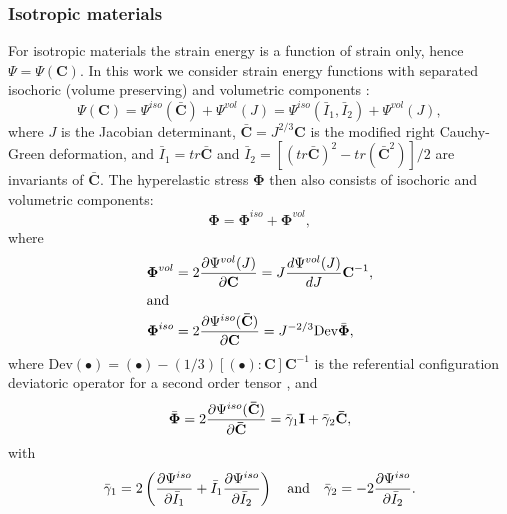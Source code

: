 	\subsubsection*{Isotropic materials}
For isotropic materials the strain energy is a function of strain only, hence $ \Psi = \Psi (\mathbf{C}) $. In this work we consider strain energy functions with separated isochoric (volume preserving) and volumetric components \citep{Holzapfel00}:
\begin{equation}
\label{chap5:IstrainEnergy}
\Psi (\mathbf{C}) = \Psi ^{iso} (\mathbf{\bar{C}}) + \Psi ^{vol} (J) = \Psi ^{iso} (\bar{I}_1, \bar{I}_2) + \Psi ^{vol} (J),
\end{equation}
where $ J $ is the Jacobian determinant, $ \mathbf{\bar{C}} = J^{2/3} \mathbf{C} $ is the modified right Cauchy-Green deformation, and $ \bar{I}_1 = tr \mathbf{\bar{C}} $ and $ \bar{I}_2 = \left[ (tr \mathbf{\bar{C}})^2 - tr (\mathbf{\bar{C}}^2) \right] / 2 $ are invariants of $ \mathbf{\bar{C}} $. The hyperelastic stress $ \boldsymbol \Phi $ then also consists of isochoric and volumetric components: 
\begin{equation}
\boldsymbol \Phi = \boldsymbol \Phi^{iso} +\boldsymbol \Phi^{vol} ,
\end{equation}
where
\begin{align}
\boldsymbol \Phi^{vol} &= 2 \dfrac{\partial \Psi^{vol}(J)}{\partial \mathbf{C}} = J \dfrac{d\Psi^{vol}(J)}{dJ} \mathbf{C}^{-1}, \label{chap5:Phi_vol} \\
\intertext{and}
\boldsymbol \Phi^{iso} &= 2 \dfrac{\partial \Psi^{iso}(\mathbf{\bar{C}})}{\partial \mathbf{C}} = J^{-2/3} \mbox{Dev}  \bar{\boldsymbol \Phi}, \label{chap5:Phi_iso}
\end{align}
where Dev$(\bullet) = (\bullet) - (1/3)[(\bullet) : \mathbf{C}] \mathbf{C}^{-1}$ is the referential configuration deviatoric operator for a second order tensor \citep{Holzapfel00}, and
\begin{equation}
\label{chap5:PhiBar}
\bar{\boldsymbol \Phi} = 2 \dfrac{\partial \Psi^{iso}(\mathbf{\bar{C}})}{\partial \mathbf{\bar{C}}} = \bar{\gamma}_1 \mathbf{I} + \bar{\gamma}_2 \mathbf{\bar{C}},
\end{equation}
with 
\begin{equation}
\bar{\gamma}_1 = 2 \left( \dfrac{\partial \Psi^{iso}}{\partial \bar{I}_1} + \bar{I}_1 \dfrac{\partial \Psi^{iso}}{\partial \bar{I}_2} \right) \quad \mbox{and} \quad \bar{\gamma}_2 = -2 \dfrac{\partial \Psi^{iso}}{\partial \bar{I}_2}.
\end{equation}

	
